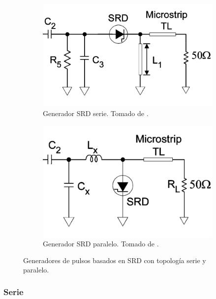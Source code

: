 \begin{figure}
    \centering
    \begin{subfigure}[b]{0.45\textwidth}
        \centering
        \includegraphics[width=\textwidth]{images/srd_series_generator.png}
        \caption{Generador SRD serie. Tomado de \cite{han2005}.}
        \label{fig:srd_series_generator}
    \end{subfigure}
    \hfill
    \begin{subfigure}[b]{0.45\textwidth}
        \centering
        \includegraphics[width=\textwidth]{images/srd_shunt_generator.png}
        \caption{Generador SRD paralelo. Tomado de \cite{han2005}.}
        \label{fig:srd_shunt_generator}
    \end{subfigure}
    \caption{Generadores de pulsos basados en SRD con topología serie y
    paralelo.}
    \label{fig:srd_pulse_generator_topologies}
\end{figure}

\subsubsection{Serie}

